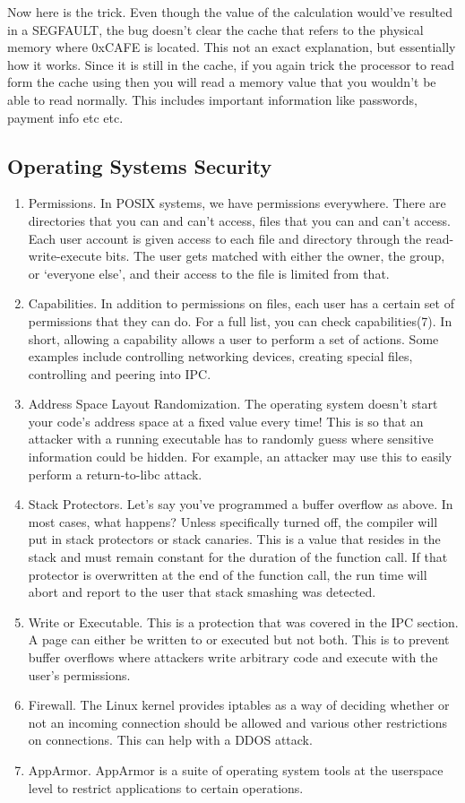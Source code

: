 Now here is the trick.
Even though the value of the calculation would've resulted in a SEGFAULT, the bug doesn't clear the cache that refers to the physical memory where 0xCAFE is located. This not an exact explanation, but essentially how it works.
Since it is still in the cache, if you again trick the processor to read form the cache using  then you will read a memory value that you wouldn't be able to read normally.
This includes important information like passwords, payment info etc etc.

\subsection{Operating Systems Security}

\begin{enumerate}
\item Permissions. In POSIX systems, we have permissions everywhere. There are directories that you can and can't access, files that you can and can't access. Each user account is given access to each file and directory through the read-write-execute bits. The user gets matched with either the owner, the group, or `everyone else', and their access to the file is limited from that.
\item Capabilities. In addition to permissions on files, each user has a certain set of permissions that they can do. For a full list, you can check capabilities(7). In short, allowing a capability allows a user to perform a set of actions. Some examples include controlling networking devices, creating special files, controlling and peering into IPC.
\item Address Space Layout Randomization. The operating system doesn't start your code's address space at a fixed value every time! This is so that an attacker with a running executable has to randomly guess where sensitive information could be hidden. For example, an attacker may use this to easily perform a return-to-libc attack.
\item Stack Protectors. Let's say you've programmed a buffer overflow as above. In most cases, what happens? Unless specifically turned off, the compiler will put in stack protectors or stack canaries. This is a value that resides in the stack and must remain constant for the duration of the function call. If that protector is overwritten at the end of the function call, the run time will abort and report to the user that stack smashing was detected.
\item Write or Executable. This is a protection that was covered in the IPC section. A page can either be written to or executed but not both. This is to prevent buffer overflows where attackers write arbitrary code and execute with the user's permissions.
\item Firewall. The Linux kernel provides iptables as a way of deciding whether or not an incoming connection should be allowed and various other restrictions on connections. This can help with a DDOS attack.
\item AppArmor. AppArmor is a suite of operating system tools at the userspace level to restrict applications to certain operations.
\end{enumerate}

